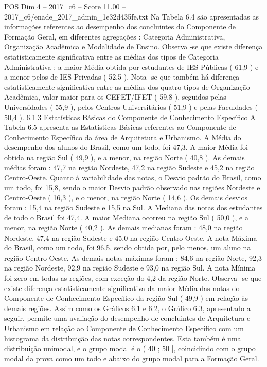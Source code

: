 \begin{textsample}{POS Dim 4 – 2017\_c6 – Score 11.00 – 2017\_c6/enade\_2017\_admin\_1e32d435fe.txt}
Na Tabela 6.4 são apresentadas as informações referentes ao desempenho dos concluintes do Componente de Formação Geral, em diferentes agregações : Categoria Administrativa, Organização Acadêmica e Modalidade de Ensino.
Observa -se que existe diferença estatisticamente significativa entre as médias dos tipos de Categoria Administrativa : a maior Média obtida por estudantes de IES Públicas ( 61,9 ) e a menor pelos de IES Privadas ( 52,5 ).
Nota -se que também há diferença estatisticamente significativa entre as médias dos quatro tipos de Organização Acadêmica, valor maior para os CEFET/IFET ( 59,8 ), seguidos pelas Universidades ( 55,9 ), pelos Centros Universitários ( 51,9 ) e pelas Faculdades ( 50,4 ). 6.1.3 Estatísticas Básicas do Componente de Conhecimento Específico A Tabela 6.5 apresenta as Estatísticas Básicas referentes ao Componente de Conhecimento Específico da área de Arquitetura e Urbanismo.
A Média do desempenho dos alunos do Brasil, como um todo, foi 47,3.
A maior Média foi obtida na região Sul ( 49,9 ), e a menor, na região Norte ( 40,8 ).
As demais médias foram : 47,7 na região Nordeste, 47,2 na região Sudeste e 45,2 na região Centro-Oeste.
Quanto à variabilidade das notas, o Desvio padrão do Brasil, como um todo, foi 15,8, sendo o maior Desvio padrão observado nas regiões Nordeste e Centro-Oeste ( 16,3 ), e o menor, na região Norte ( 14,6 ).
Os demais desvios foram : 15,4 na região Sudeste e 15,5 na Sul.
A Mediana das notas dos estudantes de todo o Brasil foi 47,4.
A maior Mediana ocorreu na região Sul ( 50,0 ), e a menor, na região Norte ( 40,2 ).
As demais medianas foram : 48,0 na região Nordeste, 47,4 na região Sudeste e 45,0 na região Centro-Oeste.
A nota Máxima do Brasil, como um todo, foi 96,5, sendo obtida por, pelo menos, um aluno na região Centro-Oeste.
As demais notas máximas foram : 84,6 na região Norte, 92,3 na região Nordeste, 92,9 na região Sudeste e 93,0 na região Sul.
A nota Mínima foi zero em todas as regiões, com exceção do 4,2 da região Norte.
Observa -se que existe diferença estatisticamente significativa da maior Média das notas do Componente de Conhecimento Específico da região Sul ( 49,9 ) em relação às demais regiões.
Assim como os Gráficos 6.1 e 6.2, o Gráfico 6.3, apresentado a seguir, permite uma avaliação do desempenho de concluintes de Arquitetura e Urbanismo em relação ao Componente de Conhecimento Específico com um histograma da distribuição das notas correspondentes.
Esta também é uma distribuição unimodal, e o grupo modal é o ( 40 ; 50 ], coincidindo com o grupo modal da prova como um todo e abaixo do grupo modal para a Formação Geral.

\end{textsample}
